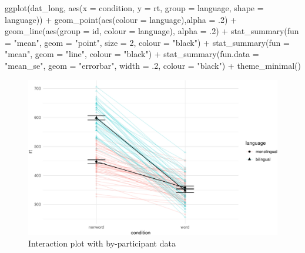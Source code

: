 \documentclass[
  english,
  doc,floatsintext]{apa6}
\newenvironment{Shaded}{\begin{snugshade}}{\end{snugshade}}
\newcommand{\AttributeTok}[1]{\textcolor[rgb]{0.77,0.63,0.00}{#1}}
\newcommand{\DecValTok}[1]{\textcolor[rgb]{0.00,0.00,0.81}{#1}}
\newcommand{\FunctionTok}[1]{\textcolor[rgb]{0.00,0.00,0.00}{#1}}
\newcommand{\NormalTok}[1]{#1}
\newcommand{\SpecialCharTok}[1]{\textcolor[rgb]{0.00,0.00,0.00}{#1}}
\newcommand{\StringTok}[1]{\textcolor[rgb]{0.31,0.60,0.02}{#1}}
\begin{document}
\begin{Shaded}
\begin{Highlighting}[]
\FunctionTok{ggplot}\NormalTok{(dat\_long, }\FunctionTok{aes}\NormalTok{(}\AttributeTok{x =}\NormalTok{ condition, }\AttributeTok{y =}\NormalTok{ rt, }\AttributeTok{group =}\NormalTok{ language, }\AttributeTok{shape =}\NormalTok{ language)) }\SpecialCharTok{+}
  \FunctionTok{geom\_point}\NormalTok{(}\FunctionTok{aes}\NormalTok{(}\AttributeTok{colour =}\NormalTok{ language),}\AttributeTok{alpha =}\NormalTok{ .}\DecValTok{2}\NormalTok{) }\SpecialCharTok{+}
  \FunctionTok{geom\_line}\NormalTok{(}\FunctionTok{aes}\NormalTok{(}\AttributeTok{group =}\NormalTok{ id, }\AttributeTok{colour =}\NormalTok{ language), }\AttributeTok{alpha =}\NormalTok{ .}\DecValTok{2}\NormalTok{) }\SpecialCharTok{+}
   \FunctionTok{stat\_summary}\NormalTok{(}\AttributeTok{fun =} \StringTok{"mean"}\NormalTok{, }\AttributeTok{geom =} \StringTok{"point"}\NormalTok{, }\AttributeTok{size =} \DecValTok{2}\NormalTok{, }\AttributeTok{colour =} \StringTok{"black"}\NormalTok{) }\SpecialCharTok{+}
  \FunctionTok{stat\_summary}\NormalTok{(}\AttributeTok{fun =} \StringTok{"mean"}\NormalTok{, }\AttributeTok{geom =} \StringTok{"line"}\NormalTok{, }\AttributeTok{colour =} \StringTok{"black"}\NormalTok{) }\SpecialCharTok{+}
  \FunctionTok{stat\_summary}\NormalTok{(}\AttributeTok{fun.data =} \StringTok{"mean\_se"}\NormalTok{, }\AttributeTok{geom =} \StringTok{"errorbar"}\NormalTok{, }\AttributeTok{width =}\NormalTok{ .}\DecValTok{2}\NormalTok{, }\AttributeTok{colour =} \StringTok{"black"}\NormalTok{) }\SpecialCharTok{+}
  \FunctionTok{theme\_minimal}\NormalTok{()}
\end{Highlighting}
\end{Shaded}

\begin{figure}

{\centering \includegraphics[width=1\linewidth]{images/ixn-by-subj-1} 

}

\caption{Interaction plot with by-participant data}\label{fig:ixn-by-subj}
\end{figure}
\end{document}
